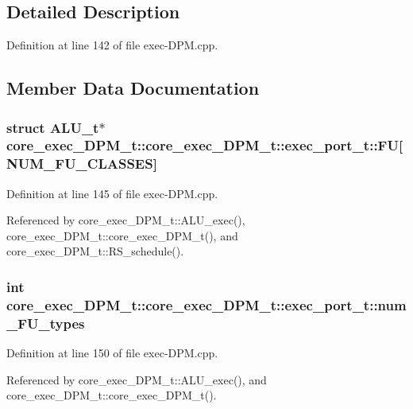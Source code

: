 \subsection{Detailed Description}


Definition at line 142 of file exec-DPM.cpp.

\subsection{Member Data Documentation}
\subsubsection[{FU}]{\setlength{\rightskip}{0pt plus 5cm}struct {\bf ALU\_\-t}$\ast$ core\_\-exec\_\-DPM\_\-t::core\_\-exec\_\-DPM\_\-t::exec\_\-port\_\-t::FU[NUM\_\-FU\_\-CLASSES]\hspace{0.3cm}{\tt  [read]}}\label{structcore__exec__DPM__t_1_1exec__port__t_010d4af24d4fc5e753676432cc29180c}




Definition at line 145 of file exec-DPM.cpp.

Referenced by core\_\-exec\_\-DPM\_\-t::ALU\_\-exec(), core\_\-exec\_\-DPM\_\-t::core\_\-exec\_\-DPM\_\-t(), and core\_\-exec\_\-DPM\_\-t::RS\_\-schedule().
\subsubsection[{num\_\-FU\_\-types}]{\setlength{\rightskip}{0pt plus 5cm}int core\_\-exec\_\-DPM\_\-t::core\_\-exec\_\-DPM\_\-t::exec\_\-port\_\-t::num\_\-FU\_\-types}\label{structcore__exec__DPM__t_1_1exec__port__t_2447d80ac9daa272dc0d2c5af375cf8e}




Definition at line 150 of file exec-DPM.cpp.

Referenced by core\_\-exec\_\-DPM\_\-t::ALU\_\-exec(), and core\_\-exec\_\-DPM\_\-t::core\_\-exec\_\-DPM\_\-t().
